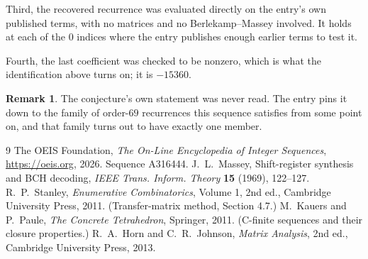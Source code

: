 \documentclass[11pt,a4paper]{article}
\theoremstyle{plain}
\theoremstyle{definition}
\newtheorem{remark}[theorem]{Remark}
\begin{document}
Third, the recovered recurrence was evaluated directly on the entry's own published terms, with
no matrices and no Berlekamp--Massey involved. It holds at each of the $0$ indices where
the entry publishes enough earlier terms to test it.

Fourth, the last coefficient was checked to be nonzero, which is what the identification above
turns on; it is $-15360$.

\begin{remark}
The conjecture's own statement was never read. The entry pins it down to the family of
order-$69$ recurrences this sequence satisfies from some point on, and that family turns
out to have exactly one member.
\end{remark}

\begin{thebibliography}{9}
 The OEIS Foundation, \emph{The On-Line Encyclopedia of Integer
Sequences}, \url{https://oeis.org}, 2026. Sequence A316444.
 J.~L.~Massey, Shift-register synthesis and BCH decoding, \emph{IEEE
Trans. Inform. Theory} \textbf{15} (1969), 122--127.
 R.~P.~Stanley, \emph{Enumerative Combinatorics}, Volume 1, 2nd ed.,
Cambridge University Press, 2011. (Transfer-matrix method, Section 4.7.)
 M.~Kauers and P.~Paule, \emph{The Concrete Tetrahedron}, Springer, 2011.
(C-finite sequences and their closure properties.)
 R.~A.~Horn and C.~R.~Johnson, \emph{Matrix Analysis}, 2nd ed., Cambridge
University Press, 2013.
\end{thebibliography}
\end{document}
